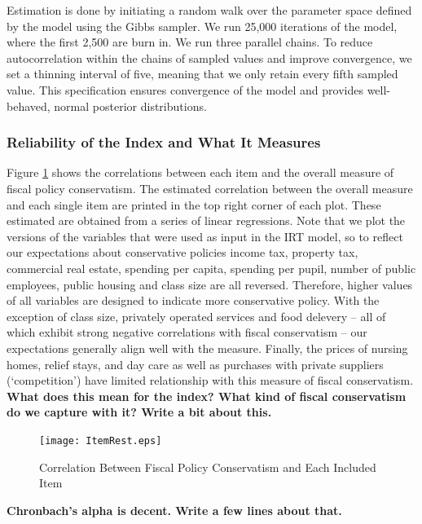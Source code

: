 \documentclass[a4paper,12pt]{article}
\begin{document}
Estimation is done by initiating a random walk over the parameter space defined by the model using the Gibbs sampler. We run 25,000 iterations of the model, where the first 2,500 are burn in. We run three parallel chains. To reduce autocorrelation within the chains of sampled values and improve convergence, we set a thinning interval of five, meaning that we only retain every fifth sampled value. This specification ensures  convergence of the model and provides well-behaved, normal posterior distributions.

\subsubsection*{Reliability of the Index and What It Measures}

Figure \ref{fig:ItemRest} shows the correlations between each item and the overall measure of fiscal policy conservatism. The estimated correlation between the overall measure and each single item are printed in the top right corner of each plot. These estimated are obtained from a series of linear regressions. Note that we plot the versions of the variables that were used as input in the IRT model, so to reflect our expectations about conservative policies income tax, property tax, commercial real estate, spending per capita, spending per pupil, number of public employees, public housing and class size are all reversed. Therefore, higher values of all variables are designed to indicate more conservative policy. With the exception of class size, privately operated services and food delevery -- all of which exhibit strong negative correlations with fiscal conservatism -- our expectations generally align well with the measure. Finally, the prices of nursing homes, relief stays, and day care as well as purchases with private suppliers (`competition') have limited relationship with this measure of fiscal conservatism. \textbf{What does this mean for the index? What kind of fiscal conservatism do we capture with it? Write a bit about this.}

\begin{figure}[htbp]
	\centering 
	
	\texttt{[image: ItemRest.eps]}
	\caption{Correlation Between Fiscal Policy Conservatism and Each Included Item}
	\label{fig:ItemRest}
	
\end{figure}


\textbf{Chronbach's alpha is decent. Write a few lines about that.}
\end{document}
